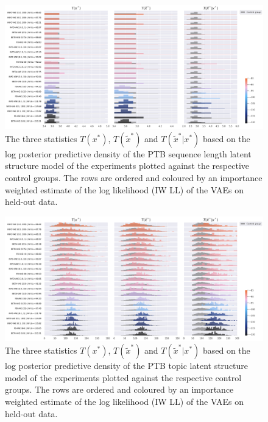 \begin{figure}[!htb]
    \centering
    \includegraphics[width=\textwidth]{images/surprisal_dists/ptb_seq_len_surprisal_dist.png}
    \caption{The three statistics $T(x^*)$, $T(\tilde x^*)$ and $T(\tilde x^*|x^*)$ based on the log posterior predictive density of the PTB sequence length latent structure model of the experiments plotted against the respective control groups. The rows are ordered and coloured by an importance weighted estimate of the log likelihood (IW LL) of the VAEs on held-out data.}
    \label{fig:ptb_seq_len_surprisal_dist}
\end{figure}

\begin{figure}[!htb]
    \centering
    \includegraphics[width=\textwidth]{images/surprisal_dists/ptb_lda_topics_surprisal_dist.png}
    \caption{The three statistics $T(x^*)$, $T(\tilde x^*)$ and $T(\tilde x^*|x^*)$ based on the log posterior predictive density of the PTB topic latent structure model of the experiments plotted against the respective control groups. The rows are ordered and coloured by an importance weighted estimate of the log likelihood (IW LL) of the VAEs on held-out data.}
    \label{fig:ptb_lda_topics_surprisal_dist}
\end{figure}

